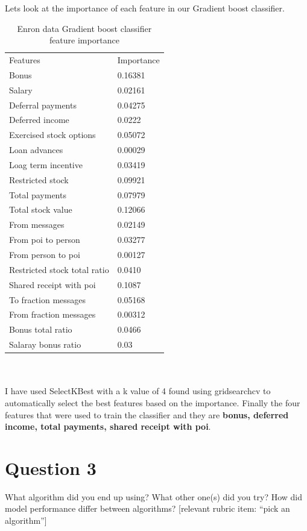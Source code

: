 \documentclass[12pt]{article}%
\begin{document}
Lets look at the importance of each feature in our Gradient boost classifier.
\begin{table}[!htb]
\centering
\caption{Enron data Gradient boost classifier feature importance}
\label{my-label}
\begin{tabular}{ll}
 Features & Importance \\
 Bonus & 0.16381 \\
 Salary & 0.02161 \\
 Deferral payments & 0.04275 \\
 Deferred income &  0.0222 \\
 Exercised stock options &  0.05072 \\
 Loan advances & 0.00029 \\
 Loag term incentive & 0.03419 \\
 Restricted stock & 0.09921\\
 Total payments & 0.07979 \\
 Total stock value & 0.12066 \\
 From messages & 0.02149 \\
 From poi to person & 0.03277 \\
 From person to poi &  0.00127 \\
 Restricted stock total ratio & 0.0410 \\
 Shared receipt with poi & 0.1087 \\
 To fraction messages & 0.05168 \\
 From fraction messages & 0.00312 \\
 Bonus total ratio & 0.0466 \\
 Salaray bonus ratio & 0.03 \\
\end{tabular}
\end{table}
\\
\\
\newpage
I have used SelectKBest with a k value of 4 found using gridsearchcv to automatically select the best features based on the importance. Finally the four features that were used to train the classifier and they are \textbf{bonus, deferred income, total payments, shared receipt with poi}.
\newpage
\section*{Question 3}
What algorithm did you end up using? What other one(s) did you try? How did model performance differ between algorithms?  [relevant rubric item: “pick an algorithm”]
\end{document}
